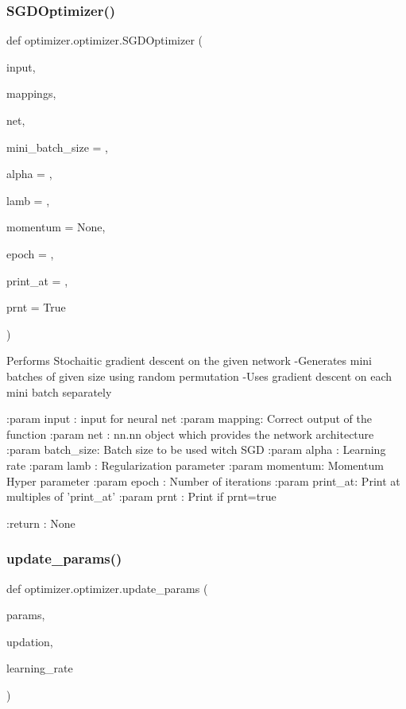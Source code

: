 \subsubsection{\texorpdfstring{S\+G\+D\+Optimizer()}{SGDOptimizer()}}
{\footnotesize\ttfamily def optimizer.\+optimizer.\+S\+G\+D\+Optimizer (\begin{DoxyParamCaption}\item[{}]{input,  }\item[{}]{mappings,  }\item[{}]{net,  }\item[{}]{mini\+\_\+batch\+\_\+size = {},  }\item[{}]{alpha = {},  }\item[{}]{lamb = {},  }\item[{}]{momentum = {\ttfamily None},  }\item[{}]{epoch = {},  }\item[{}]{print\+\_\+at = {},  }\item[{}]{prnt = {\ttfamily True} }\end{DoxyParamCaption})\hspace{0.3cm}{\ttfamily [static]}}

\begin{DoxyVerb}Performs Stochaitic gradient descent on the given network
-Generates mini batches of given size using random permutation
-Uses gradient descent on each mini batch separately

:param input  : input for neural net
:param mapping: Correct output of the function
:param net    : nn.nn object which provides the network architecture
:param batch_size: Batch size to be used witch SGD
:param alpha  : Learning rate
:param lamb   : Regularization parameter
:param momentum: Momentum Hyper parameter
:param epoch  : Number of iterations
:param print_at: Print at multiples of 'print_at'
:param prnt   : Print if prnt=true

:return : None
\end{DoxyVerb}
 \mbox{\label{classoptimizer_1_1optimizer_ae54007767b7637fc2a1bfd0bc0a71934}} 
\subsubsection{\texorpdfstring{update\+\_\+params()}{update\_params()}}
{\footnotesize\ttfamily def optimizer.\+optimizer.\+update\+\_\+params (\begin{DoxyParamCaption}\item[{}]{params,  }\item[{}]{updation,  }\item[{}]{learning\+\_\+rate }\end{DoxyParamCaption})\hspace{0.3cm}{\ttfamily [static]}}

